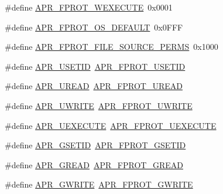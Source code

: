 \begin{DoxyCompactItemize}
\item 
\#define \hyperlink{group__apr__file__permissions_ga760d69c09b38ddf1e0aff09362d8ce11}{A\+P\+R\+\_\+\+F\+P\+R\+O\+T\+\_\+\+W\+E\+X\+E\+C\+U\+TE}~0x0001
\item 
\#define \hyperlink{group__apr__file__permissions_gad3c65a67ee6eb12ecc6a33857397900b}{A\+P\+R\+\_\+\+F\+P\+R\+O\+T\+\_\+\+O\+S\+\_\+\+D\+E\+F\+A\+U\+LT}~0x0\+F\+FF
\item 
\#define \hyperlink{group__apr__file__permissions_gac08d4e868c7c9532f7c97c70556663dc}{A\+P\+R\+\_\+\+F\+P\+R\+O\+T\+\_\+\+F\+I\+L\+E\+\_\+\+S\+O\+U\+R\+C\+E\+\_\+\+P\+E\+R\+MS}~0x1000
\item 
\#define \hyperlink{group__apr__file__permissions_gafae6b531c08999345536cae5654d0d03}{A\+P\+R\+\_\+\+U\+S\+E\+T\+ID}~\hyperlink{group__apr__file__permissions_ga67caebf5bbe4f3f4b6252a75e5ce066f}{A\+P\+R\+\_\+\+F\+P\+R\+O\+T\+\_\+\+U\+S\+E\+T\+ID}
\item 
\#define \hyperlink{group__apr__file__permissions_ga51dc87ecd94c98e97694e68d5d9620a0}{A\+P\+R\+\_\+\+U\+R\+E\+AD}~\hyperlink{group__apr__file__permissions_gaab6c4c2e7b95f4345c248c27b3f1a655}{A\+P\+R\+\_\+\+F\+P\+R\+O\+T\+\_\+\+U\+R\+E\+AD}
\item 
\#define \hyperlink{group__apr__file__permissions_ga4faa7fdfa3bcda569dd1e23ae002c5e5}{A\+P\+R\+\_\+\+U\+W\+R\+I\+TE}~\hyperlink{group__apr__file__permissions_ga50b985779b15fbfdae0758e98ffb92af}{A\+P\+R\+\_\+\+F\+P\+R\+O\+T\+\_\+\+U\+W\+R\+I\+TE}
\item 
\#define \hyperlink{group__apr__file__permissions_ga4c08d7e798ab4022e31ed70f06f202b5}{A\+P\+R\+\_\+\+U\+E\+X\+E\+C\+U\+TE}~\hyperlink{group__apr__file__permissions_ga156e1374a4ef30e745340d8c20b36d03}{A\+P\+R\+\_\+\+F\+P\+R\+O\+T\+\_\+\+U\+E\+X\+E\+C\+U\+TE}
\item 
\#define \hyperlink{group__apr__file__permissions_ga4e4e9bb05f2bb156b174461551c9c329}{A\+P\+R\+\_\+\+G\+S\+E\+T\+ID}~\hyperlink{group__apr__file__permissions_ga5fcf6746afdd4e9b8be6ceab6892a3f5}{A\+P\+R\+\_\+\+F\+P\+R\+O\+T\+\_\+\+G\+S\+E\+T\+ID}
\item 
\#define \hyperlink{group__apr__file__permissions_ga1bd0305f31cb3bb20a8f9db898b96eb1}{A\+P\+R\+\_\+\+G\+R\+E\+AD}~\hyperlink{group__apr__file__permissions_ga5ad9b67b8008db3ffc56c3c2a65aa192}{A\+P\+R\+\_\+\+F\+P\+R\+O\+T\+\_\+\+G\+R\+E\+AD}
\item 
\#define \hyperlink{group__apr__file__permissions_ga794c425b459aa46939f6febabbe9daef}{A\+P\+R\+\_\+\+G\+W\+R\+I\+TE}~\hyperlink{group__apr__file__permissions_gacecdc9f88b04c768150418688b786500}{A\+P\+R\+\_\+\+F\+P\+R\+O\+T\+\_\+\+G\+W\+R\+I\+TE}

\end{DoxyCompactItemize}
